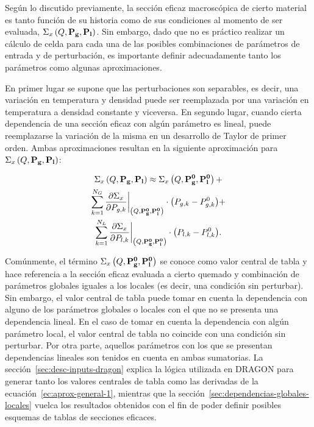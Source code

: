 \documentclass[11pt]{article}
\renewcommand{\vec}[1]{\ensuremath\mathbf{#1}}
\begin{document}
Según lo discutido previamente, la sección eficaz macroscópica de cierto material es tanto función de su historia como de sus condiciones al momento de ser evaluada, $\Sigma_x \left( Q, \vec{P_g}, \vec{P_l} \right)$. Sin embargo, dado que no es práctico realizar un cálculo de celda para cada una de las posibles combinaciones de parámetros de entrada y de perturbación, es importante definir adecuadamente tanto los parámetros como algunas aproximaciones. 

En primer lugar se supone que las perturbaciones son separables, es decir, una variación en temperatura y densidad puede ser reemplazada por una variación en temperatura a densidad constante y viceversa. En segundo lugar, cuando cierta dependencia de una sección eficaz con algún parámetro es lineal, puede reemplazarse la variación de la misma en un desarrollo de Taylor de primer orden. Ambas aproximaciones resultan en la siguiente aproximación para $\Sigma_x \left( Q, \vec{P_g}, \vec{P_l} \right)$:

\begin{multline} \label{ec:aprox-general-1}
 \Sigma_x \left( Q, \vec{P_g}, \vec{P_l} \right) \approx 
 \Sigma_x \left( Q, \vec{P^0_g}, \vec{P^0_l} \right) + \\
 \sum_{k = 1}^{N_G}{\frac{\partial\Sigma_x}{\partial P_{g,k}}\bigg|_{\left( Q, \vec{P^0_g}, \vec{P^0_l} \right)} \cdot \left(P_{g,k} - P^0_{g,k} \right) } + \\
 \sum_{k = 1}^{N_L}{\frac{\partial\Sigma_x}{\partial P_{l,k}}\bigg|_{\left( Q, \vec{P^0_g}, \vec{P^0_l} \right)} \cdot \left(P_{l,k} - P^0_{l,k} \right) }.
\end{multline}

\noindent
Comúnmente, el término $\Sigma_x \left( Q, \vec{P^0_g}, \vec{P^0_l} \right)$ se conoce como valor central de tabla y hace referencia a la sección eficaz evaluada a cierto quemado y combinación de parámetros globales iguales a los locales (es decir, una condición sin perturbar). Sin embargo, el valor central de tabla puede tomar en cuenta la dependencia con alguno de los parámetros globales o locales con el que no se presenta una dependencia lineal. En el caso de tomar en cuenta la dependencia con algún parámetro local, el valor central de tabla no coincide con una condición sin perturbar. Por otra parte, aquellos parámetros con los que se presentan dependencias lineales son tenidos en cuenta en ambas sumatorias. La sección~\ref{sec:desc-inputs-dragon} explica la lógica utilizada en DRAGON para generar tanto los valores centrales de tabla como las derivadas de la ecuación~\ref{ec:aprox-general-1}, mientras que la sección~\ref{sec:dependencias-globales-locales} vuelca los resultados obtenidos con el fin de poder definir posibles esquemas de tablas de secciones eficaces.
\end{document}
